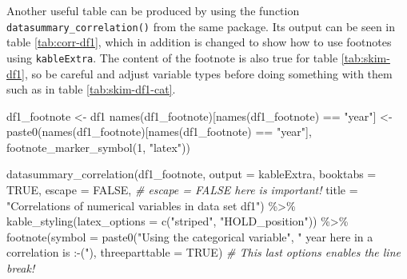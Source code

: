 \documentclass[
  11pt,
  a4paper,
  twoside]{scrbook}
\newenvironment{Shaded}{\begin{snugshade}}{\end{snugshade}}
\newcommand{\AttributeTok}[1]{\textcolor[rgb]{0.77,0.63,0.00}{#1}}
\newcommand{\CommentTok}[1]{\textcolor[rgb]{0.56,0.35,0.01}{\textit{#1}}}
\newcommand{\ConstantTok}[1]{\textcolor[rgb]{0.00,0.00,0.00}{#1}}
\newcommand{\DecValTok}[1]{\textcolor[rgb]{0.00,0.00,0.81}{#1}}
\newcommand{\FunctionTok}[1]{\textcolor[rgb]{0.00,0.00,0.00}{#1}}
\newcommand{\NormalTok}[1]{#1}
\newcommand{\OtherTok}[1]{\textcolor[rgb]{0.56,0.35,0.01}{#1}}
\newcommand{\SpecialCharTok}[1]{\textcolor[rgb]{0.00,0.00,0.00}{#1}}
\newcommand{\StringTok}[1]{\textcolor[rgb]{0.31,0.60,0.02}{#1}}
\begin{document}
Another useful table can be produced by using the function \texttt{datasummary\_correlation()} from the same package. Its output can be seen in table \ref{tab:corr-df1}, which in addition is changed to show how to use footnotes using \texttt{kableExtra}. The content of the footnote is also true for table \ref{tab:skim-df1}, so be careful and adjust variable types before doing something with them such as in table \ref{tab:skim-df1-cat}.

\linespread{1}

\begin{Shaded}
\begin{Highlighting}[]
\NormalTok{df1\_footnote }\OtherTok{\textless{}{-}}\NormalTok{ df1}
\FunctionTok{names}\NormalTok{(df1\_footnote)[}\FunctionTok{names}\NormalTok{(df1\_footnote) }\SpecialCharTok{==} \StringTok{"year"}\NormalTok{] }\OtherTok{\textless{}{-}} 
    \FunctionTok{paste0}\NormalTok{(}\FunctionTok{names}\NormalTok{(df1\_footnote)[}\FunctionTok{names}\NormalTok{(df1\_footnote) }\SpecialCharTok{==} \StringTok{"year"}\NormalTok{], }
           \FunctionTok{footnote\_marker\_symbol}\NormalTok{(}\DecValTok{1}\NormalTok{, }\StringTok{"latex"}\NormalTok{))}

\FunctionTok{datasummary\_correlation}\NormalTok{(df1\_footnote, }\AttributeTok{output =} \StringTok{\textquotesingle{}kableExtra\textquotesingle{}}\NormalTok{,}
        \AttributeTok{booktabs =} \ConstantTok{TRUE}\NormalTok{, }\AttributeTok{escape =} \ConstantTok{FALSE}\NormalTok{, }\CommentTok{\# \textquotesingle{}escape = FALSE\textquotesingle{} here is important!}
        \AttributeTok{title =} \StringTok{"Correlations of numerical variables in data set df1"}\NormalTok{) }\SpecialCharTok{\%\textgreater{}\%} 
    \FunctionTok{kable\_styling}\NormalTok{(}\AttributeTok{latex\_options =} \FunctionTok{c}\NormalTok{(}\StringTok{"striped"}\NormalTok{, }\StringTok{"HOLD\_position"}\NormalTok{)) }\SpecialCharTok{\%\textgreater{}\%} 
    \FunctionTok{footnote}\NormalTok{(}\AttributeTok{symbol =} \FunctionTok{paste0}\NormalTok{(}\StringTok{"Using the categorical variable"}\NormalTok{,}
                             \StringTok{" \textquotesingle{}year\textquotesingle{} here in a correlation is :{-}("}\NormalTok{),}
             \AttributeTok{threeparttable =} \ConstantTok{TRUE}\NormalTok{) }\CommentTok{\# This last options enables the line break!}
\end{Highlighting}
\end{Shaded}

\linespread{1}
\end{document}
